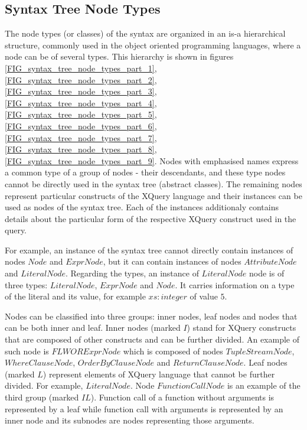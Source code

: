 \subsection{Syntax Tree Node Types}
The node types (or classes) of the syntax are organized in an is-a hierarchical structure, commonly used in the object oriented programming languages, where a node can be of several types. This hierarchy is shown in figures \ref{FIG_syntax_tree_node_types_part_1}, \ref{FIG_syntax_tree_node_types_part_2}, \ref{FIG_syntax_tree_node_types_part_3}, \ref{FIG_syntax_tree_node_types_part_4}, \ref{FIG_syntax_tree_node_types_part_5}, \ref{FIG_syntax_tree_node_types_part_6}, \ref{FIG_syntax_tree_node_types_part_7}, \ref{FIG_syntax_tree_node_types_part_8}, \ref{FIG_syntax_tree_node_types_part_9}. Nodes with emphasised names express a common type of a group of nodes - their descendants, and these type nodes cannot be directly used in the syntax tree (abstract classes). The remaining nodes represent particular constructs of the XQuery language and their instances can be used as nodes of the syntax tree. Each of the instances additionaly contains details about the particular form of the respective XQuery construct used in the query.


For example, an instance of the syntax tree cannot directly contain instances of nodes $Node$ and $ExprNode$, but it can contain instances of nodes $AttributeNode$ and $LiteralNode$. Regarding the types, an instance of $LiteralNode$ node is of three types: $LiteralNode$, $ExprNode$ and $Node$. It carries information on a type of the literal and its value, for example $xs:integer$ of value $5$.


Nodes can be classified into three groups: inner nodes, leaf nodes and nodes that can be both inner and leaf. Inner nodes (marked $I$) stand for XQuery constructs that are composed of other constructs and can be further divided. An example of such node is $FLWORExprNode$ which is composed of nodes $TupleStreamNode$, $WhereClauseNode$, $OrderByClauseNode$ and $ReturnClauseNode$. Leaf nodes (marked $L$) represent elements of XQuery language that cannot be further divided. For example, $LiteralNode$. Node $FunctionCallNode$ is an example of the third group (marked $IL$). Function call of a function without arguments is represented by a leaf while function call with arguments is represented by an inner node and its subnodes are nodes representing those arguments.

